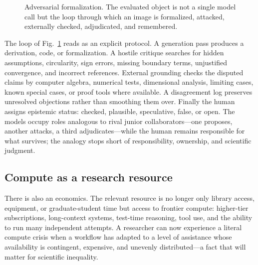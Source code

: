 \documentclass[
  aps,
  reprint,
  superscriptaddress,
  floatfix,
  nofootinbib,
  longbibliography
]{revtex4-2}
\begin{document}
\begin{figure}[t]
\centering
{}
\caption{Adversarial formalization. The evaluated object is not a single model
call but the loop through which an image is formalized, attacked, externally
checked, adjudicated, and remembered.}
\label{fig:loop}
\end{figure}

The loop of Fig.~\ref{fig:loop} reads as an explicit protocol. A generation pass
produces a derivation, code, or formalization. A hostile critique searches for
hidden assumptions, circularity, sign errors, missing boundary terms, unjustified
convergence, and incorrect references. External grounding checks the disputed
claims by computer algebra, numerical tests, dimensional analysis, limiting
cases, known special cases, or proof tools where available. A disagreement log
preserves unresolved objections rather than smoothing them over. Finally the
human assigns epistemic status: checked, plausible, speculative, false, or open.
The models occupy roles analogous to rival junior collaborators---one proposes,
another attacks, a third adjudicates---while the human remains responsible for
what survives; the analogy stops short of responsibility, ownership, and
scientific judgment.

\subsection{Compute as a research resource}

There is also an economics. The relevant resource is no longer only library
access, equipment, or graduate-student time but access to frontier compute:
higher-tier subscriptions, long-context systems, test-time reasoning, tool use,
and the ability to run many independent attempts. A researcher can now experience
a literal compute crisis when a workflow has adapted to a level of assistance
whose availability is contingent, expensive, and unevenly distributed---a fact
that will matter for scientific inequality.
\end{document}
